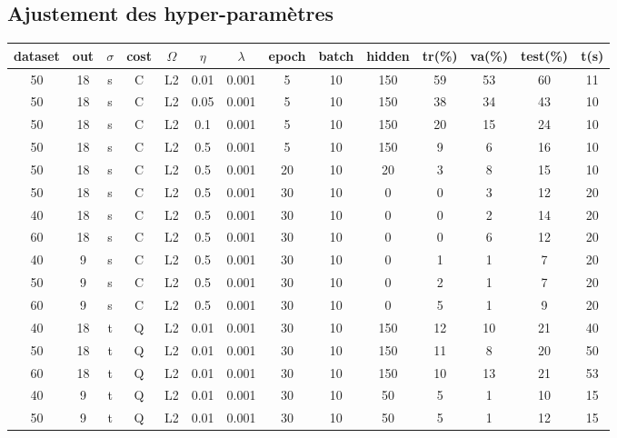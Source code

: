 \documentclass[11pt]{article}
\begin{document}
\subsection{Ajustement des hyper-param\`etres}
\begin{table}[h]
	\centering

	\begin{tabular}{|c|c|c|c|c|c|c|c|c|c|c|c|c|c|}
		\hline
		dataset & out & $\sigma$  & cost & $\Omega$ & $\eta$ & $\lambda$ &
			epoch  & batch & hidden & tr(\%) & va(\%) & test(\%) & t(s)\\
		\hline
		50 & 18 & s & C & L2 & 0.01 & 0.001 & 5 & 10 & 150 & 59 & 53 & 60 & 11 \\
		\hline
		50 & 18 & s & C & L2 & 0.05 & 0.001 & 5 & 10 & 150 & 38 & 34 & 43  & 10\\
		\hline
		50	& 18 & s & C & L2 & 0.1 & 0.001 & 5 & 10 & 150 & 20 & 15 & 24  & 10\\
		\hline
		50	& 18 & s & C & L2 & 0.5 & 0.001 & 5 & 10 & 150 & 9 & 6 & 16  & 10 \\
		\hline
		50	& 18 & s & C & L2 & 0.5 & 0.001 & 20 & 10 & 20 & 3 & 8 & 15 & 10 \\
		\hline
		50	& 18 & s & C & L2 & 0.5 & 0.001 & 30 & 10 & 0 & 0 & 3 & 12 & 20 \\
		\hline
		\rowcolor{green}
		40	& 18 & s & C & L2 & 0.5 & 0.001 & 30 & 10 & 0 & 0 & 2 & 14 & 20 \\
		\hline
		60	& 18 & s & C & L2 & 0.5 & 0.001 & 30 & 10 & 0 & 0 & 6 & 12 & 20 \\
		\hline
		\rowcolor{green}
		40	& 9 & s & C & L2 & 0.5 & 0.001 & 30 & 10 & 0 & 1 & 1 & 7 & 20 \\
		\hline
		50	& 9 & s & C & L2 & 0.5 & 0.001 & 30 & 10 & 0 & 2 & 1 & 7 & 20 \\
		\hline
		60	& 9 & s & C & L2 & 0.5 & 0.001 & 30 & 10 & 0 & 5 & 1 & 9 & 20 \\
		\hline
		40	& 18 & t & Q & L2 & 0.01 & 0.001 & 30 & 10 & 150 & 12 & 10 & 21 & 40 \\
		\hline
		50	& 18 & t & Q & L2 & 0.01 & 0.001 & 30 & 10 & 150 & 11 & 8 & 20  & 50\\
		\hline
		60	& 18 & t & Q & L2 & 0.01 & 0.001 & 30 & 10 & 150 & 10 & 13 & 21  & 53\\
		\hline
		40	& 9 & t & Q & L2 & 0.01 & 0.001 & 30 & 10 & 50 & 5 & 1 & 10  & 15\\
		\hline
		50	& 9 & t & Q & L2 & 0.01 & 0.001 & 30 & 10 & 50 & 5 & 1 & 12  & 15\\

\end{tabular}
\end{table}
\end{document}

